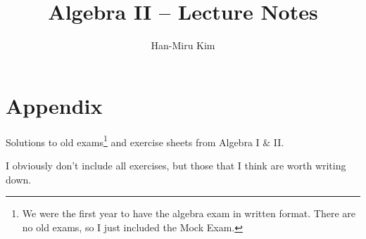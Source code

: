 \documentclass[11pt]{article}
\title{Algebra II -- Lecture Notes}
\author{Han-Miru Kim}
\begin{document}
\maketitle















\section{Appendix}
Solutions to old exams\footnote{We were the first year to have the algebra exam in written format. 
There are no old exams, so I just included the Mock Exam.} and exercise sheets from Algebra I \& II.

I obviously don't include all exercises, but those that I think are worth writing down.




\end{document}

